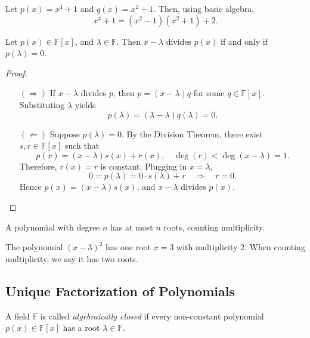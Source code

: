 \begin{example}\label{ex:division}
Let \(p(x) = x^4 + 1\) and \(q(x) = x^2 + 1\). Then, using basic algebra,
\[
x^4 + 1 = (x^2 - 1)(x^2 + 1) + 2.
\]
\end{example}

\begin{theorem}\label{thm:root}
Let \(p(x) \in \mathbb{F}[x]\), and \(\lambda \in \mathbb{F}\). Then \(x - \lambda\) divides \(p(x)\) if and only if \(p(\lambda) = 0\).
\end{theorem}

\begin{proof}
\leavevmode
\begin{enumerate}
  \item[\((\Rightarrow)\)] If \(x - \lambda\) divides \(p\), then \(p = (x - \lambda) q\) for some \(q \in \mathbb{F}[x]\). Substituting \(\lambda\) yields
  \[
  p(\lambda) = (\lambda - \lambda) q(\lambda) = 0.
  \]

  \item[\((\Leftarrow)\)] Suppose \(p(\lambda) = 0\). By the Division Theorem, there exist \(s, r \in \mathbb{F}[x]\) such that
  \[
  p(x) = (x - \lambda)s(x) + r(x), \quad \deg(r) < \deg(x - \lambda) = 1. \tag{6.1}
  \]
  Therefore, \(r(x) = r\) is constant. Plugging in \(x = \lambda\),
  \[
  0 = p(\lambda) = 0 \cdot s(\lambda) + r \quad \Rightarrow \quad r = 0.
  \]
  Hence \(p(x) = (x - \lambda)s(x)\), and \(x - \lambda\) divides \(p(x)\).
\end{enumerate}
\end{proof}


\begin{corollary}
A polynomial with degree \(n\) has at most \(n\) roots, counting multiplicity.
\end{corollary}

\begin{example}
The polynomial \((x - 3)^2\) has one root \(x = 3\) with multiplicity 2. When counting multiplicity, we say it has two roots.
\end{example}

\subsection{Unique Factorization of Polynomials}
\begin{definition}
A field \(\mathbb{F}\) is called \emph{algebraically closed} if every non-constant polynomial \(p(x) \in \mathbb{F}[x]\) has a root \(\lambda \in \mathbb{F}\).
\end{definition}

